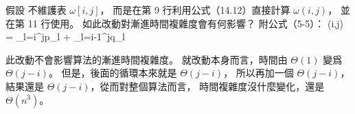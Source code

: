 \startEXERCISE
假設  不維護表 $\omega[i,j]$，
而是在第 9 行利用公式（14.12）直接計算 $\omega(i,j)$，
並在第 11 行使用。
如此改動對漸進時間複雜度會有何影響？
附公式（5-5）：
\startformula
\omega(i,j) = \sum_{l=i}^{j}p_l + \sum_{l=i-1}^{j}q_l
\stopformula
\stopEXERCISE

\startANSWER
此改動不會影響算法的漸進時間複雜度。
就改動本身而言，時間由 $\Theta(1)$ 變爲 $\Theta(j-i)$。
但是，後面的循環本來就是 $\Theta(j-i)$，
所以再加一個 $\Theta(j-i)$，
結果還是 $\Theta(j-i)$，從而對整個算法而言，
時間複雜度沒什麼變化，還是 $\Theta(n^3)$。
\stopANSWER
